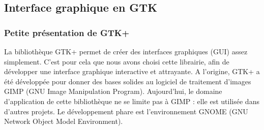 \documentclass[a4paper,12pt]{article}
\begin{document}
	\subsection{Interface graphique en GTK}

		\subsubsection{Petite présentation de GTK+}
La bibliothèque GTK+ permet de créer des interfaces graphiques (GUI) assez
simplement. C'est pour cela que nous avons choisi cette librairie, afin de
développer une interface graphique interactive et attrayante. A l'origine, GTK+
a été développée pour donner des bases solides au logiciel de traitement
d'images GIMP (GNU Image Manipulation Program). Aujourd'hui, le domaine
d'application de cette bibliothèque ne se limite pas à GIMP : elle est utilisée
dans d'autres projets. Le développement phare est l'environnement  GNOME (GNU
Network Object Model Environment).
\end{document}
